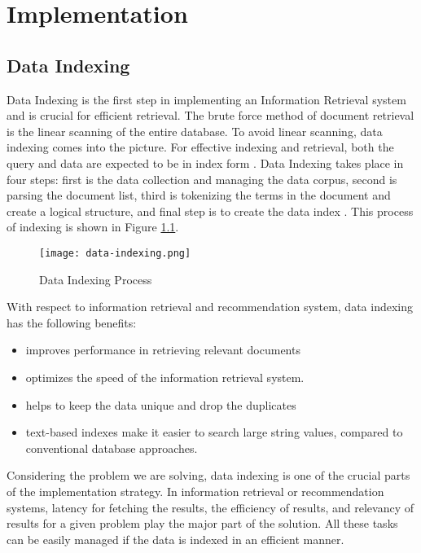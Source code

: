 \chapter{Implementation}
\section{Data Indexing}
Data Indexing is the first step in implementing an Information Retrieval system and is crucial for efficient retrieval. The brute force method of document retrieval is the linear scanning of the entire database. To avoid linear scanning, data indexing comes into the picture. For effective indexing and retrieval, both the query and data are expected to be in index form \cite{7830087}.
Data Indexing takes place in four steps: first is the data collection and managing the data corpus, second is parsing the document list, third is tokenizing the terms in the document and create a logical structure, and final step is to create the data index \cite{7830087}. This process of indexing is shown in Figure \ref{fig:data-indexing}. 

\begin{figure}
    \centering
    \texttt{[image: data-indexing.png]}
    \caption{Data Indexing Process \cite{7830087}}
    \label{fig:data-indexing}
\end{figure}

With respect to information retrieval and recommendation system, data indexing has the following benefits:
\begin{itemize}
    \item improves performance in retrieving relevant documents
    \item optimizes the speed of the information retrieval system.
    \item helps to keep the data unique and drop the duplicates
    \item text-based indexes make it easier to search large string values, compared to conventional database approaches.
\end{itemize}

Considering the problem we are solving, data indexing is one of the crucial parts of the implementation strategy. In information retrieval or recommendation systems, latency for fetching the results, the efficiency of results, and relevancy of results for a given problem play the major part of the solution. All these tasks can be easily managed if the data is indexed in an efficient manner. 


